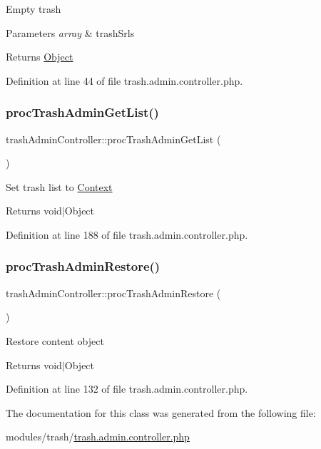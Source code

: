 Empty trash 
\begin{DoxyParams}{Parameters}
{\em array} & trash\+Srls \\
\hline
\end{DoxyParams}
\begin{DoxyReturn}{Returns}
\hyperlink{classObject}{Object} 
\end{DoxyReturn}


Definition at line 44 of file trash.\+admin.\+controller.\+php.

\mbox{\label{classtrashAdminController_af522d8b4cd292cce44ea6b1cedfcf0c1}} 
\subsubsection{\texorpdfstring{proc\+Trash\+Admin\+Get\+List()}{procTrashAdminGetList()}}
{\footnotesize\ttfamily trash\+Admin\+Controller\+::proc\+Trash\+Admin\+Get\+List (\begin{DoxyParamCaption}{ }\end{DoxyParamCaption})}

Set trash list to \hyperlink{classContext}{Context} \begin{DoxyReturn}{Returns}
void$\vert$\+Object 
\end{DoxyReturn}


Definition at line 188 of file trash.\+admin.\+controller.\+php.

\mbox{\label{classtrashAdminController_a5bd5aea6170e91d725b7f758480aba38}} 
\subsubsection{\texorpdfstring{proc\+Trash\+Admin\+Restore()}{procTrashAdminRestore()}}
{\footnotesize\ttfamily trash\+Admin\+Controller\+::proc\+Trash\+Admin\+Restore (\begin{DoxyParamCaption}{ }\end{DoxyParamCaption})}

Restore content object \begin{DoxyReturn}{Returns}
void$\vert$\+Object 
\end{DoxyReturn}


Definition at line 132 of file trash.\+admin.\+controller.\+php.



The documentation for this class was generated from the following file\+:\begin{DoxyCompactItemize}
\item 
modules/trash/\hyperlink{trash_8admin_8controller_8php}{trash.\+admin.\+controller.\+php}\end{DoxyCompactItemize}
